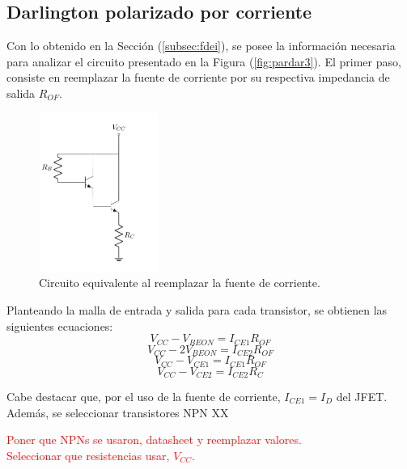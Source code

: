 \subsection{Darlington polarizado por corriente}
Con lo obtenido en la Sección (\ref{subsec:fdei}), se posee la información necesaria para analizar el circuito presentado en la Figura (\ref{fig:pardar3}). El primer paso, consiste en reemplazar la fuente de corriente por su respectiva impedancia de salida $R_{OF}$.
\begin{figure}[H]
\centering
	\includegraphics[width=0.35\textwidth, page=5]{Imagenes/ParDarlington.pdf}
	\caption{Circuito equivalente al reemplazar la fuente de corriente.}
	\label{fig:pardar4}
\end{figure}

Planteando la malla de entrada y salida para cada transistor, se obtienen las siguientes ecuaciones:
\begin{equation*}
	V_{CC} - V_{BEON} = I_{CE1} R_{OF}
\end{equation*}
\begin{equation*}
	V_{CC} - 2V_{BEON} = I_{CE2} R_{OF}
\end{equation*}
\begin{equation*}
	V_{CC} - V_{CE1} = I_{CE1} R_{OF}
\end{equation*}
\begin{equation*}
	V_{CC} - V_{CE2} = I_{CE2} R_{C}
\end{equation*}

Cabe destacar que, por el uso de la fuente de corriente, $I_{CE1} = I_{D}$ del JFET. Además, se seleccionar transistores NPN XX
\begin{center}
	\LARGE{\textcolor{red}{Poner que NPNs se usaron, datasheet y reemplazar valores.}} \\
	\LARGE{\textcolor{red}{Seleccionar que resistencias usar, $V_{CC}$.}}
\end{center}


